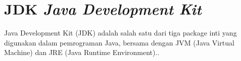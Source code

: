 \section{JDK \textit{Java Development Kit}}
Java Development Kit (JDK) adalah salah satu dari tiga package inti yang digunakan dalam pemrograman Java, bersama dengan JVM (Java Virtual Machine) dan JRE (Java Runtime Environment)..\cite{webjavaworld1}